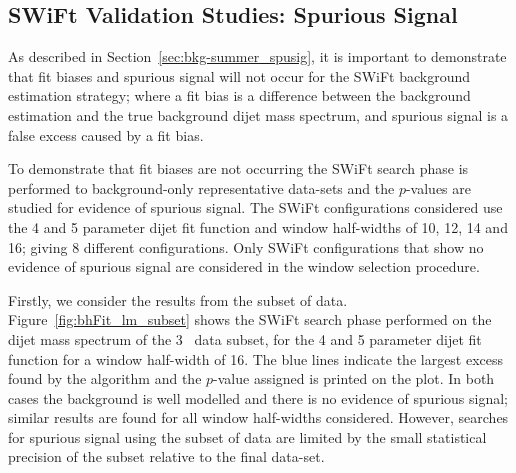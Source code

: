 
\subsection{SWiFt Validation Studies: Spurious Signal}
\label{sec:bkg-full_spuriousSignal}

As described in Section~\ref{sec:bkg-summer_spusig}, it is important to demonstrate that
fit biases and spurious signal will not occur for the SWiFt background estimation strategy;
where a fit bias is a difference between the background estimation
and the true background dijet mass spectrum, and
spurious signal is a false excess caused by a fit bias.

To demonstrate that fit biases are not occurring the SWiFt search phase is performed to background-only representative data-sets
and the \bh{} $p$-values are studied for evidence of spurious signal.
The SWiFt configurations considered use the 4 and 5 parameter dijet fit function
and window half-widths of 10, 12, 14 and 16; giving 8 different configurations.
Only SWiFt configurations that show no evidence of spurious signal are considered in the window selection procedure.

Firstly, we consider the results from the subset of data.
Figure~\ref{fig:bhFit_lm_subset} shows the SWiFt search phase performed on the dijet mass spectrum of the 3~\ifb{} data subset,
for the 4 and 5 parameter dijet fit function for a window half-width of 16.
The blue lines indicate the largest excess found by the \bh{} algorithm and the \mbox{$p$-value} assigned is printed on the plot. 
In both cases the background is well modelled and there is no evidence of spurious signal;
similar results are found for all window half-widths considered.
However, searches for spurious signal using the subset of data are limited by the 
small statistical precision of the subset relative to the final data-set.

